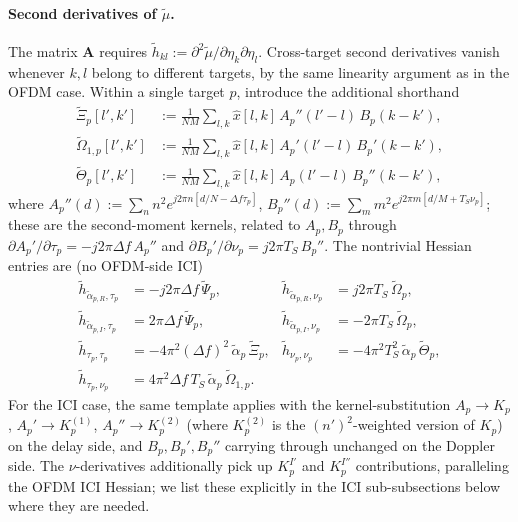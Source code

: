 \documentclass[11pt]{article}
\begin{document}
\paragraph{Second derivatives of \(\tilde{\mu}\).} The matrix \(\bm{A}\) requires \(\tilde{h}_{kl} := \partial^2 \tilde{\mu}/\partial \eta_k \partial \eta_l\). Cross-target second derivatives vanish whenever \(k,l\) belong to different targets, by the same linearity argument as in the OFDM case. Within a single target \(p\), introduce the additional shorthand
\begin{align}
    \tilde{\Xi}_p[l',k']      &:= \tfrac{1}{NM}\sum_{l,k} \hat{x}[l,k]\, A_p''(l'-l)\, B_p(k-k'), \\
    \tilde{\Omega}_{1,p}[l',k'] &:= \tfrac{1}{NM}\sum_{l,k} \hat{x}[l,k]\, A_p'(l'-l)\, B_p'(k-k'), \\
    \tilde{\Theta}_p[l',k']   &:= \tfrac{1}{NM}\sum_{l,k} \hat{x}[l,k]\, A_p(l'-l)\, B_p''(k-k'),
\end{align}
where \(A_p''(d) := \sum_n n^2 e^{j2\pi n[d/N - \Delta f \tau_p]}\), \(B_p''(d) := \sum_m m^2 e^{j2\pi m[d/M + T_S \nu_p]}\); these are the second-moment kernels, related to \(A_p, B_p\) through \(\partial A_p'/\partial \tau_p = -j2\pi\Delta f\, A_p''\) and \(\partial B_p'/\partial \nu_p = j2\pi T_S\, B_p''\). The nontrivial Hessian entries are (no OFDM-side ICI)
\begin{align}
    \tilde{h}_{\tilde{\alpha}_{p,R}, \tau_p} &= -j2\pi\Delta f\, \tilde{\Psi}_p, &
    \tilde{h}_{\tilde{\alpha}_{p,R}, \nu_p} &= j2\pi T_S\, \tilde{\Omega}_p, \\
    \tilde{h}_{\tilde{\alpha}_{p,I}, \tau_p} &= 2\pi\Delta f\, \tilde{\Psi}_p, &
    \tilde{h}_{\tilde{\alpha}_{p,I}, \nu_p} &= -2\pi T_S\, \tilde{\Omega}_p, \\
    \tilde{h}_{\tau_p, \tau_p} &= -4\pi^2 (\Delta f)^2\, \tilde{\alpha}_p\, \tilde{\Xi}_p, &
    \tilde{h}_{\nu_p, \nu_p} &= -4\pi^2 T_S^2\, \tilde{\alpha}_p\, \tilde{\Theta}_p, \\
    \tilde{h}_{\tau_p, \nu_p} &= 4\pi^2 \Delta f\, T_S\, \tilde{\alpha}_p\, \tilde{\Omega}_{1,p}. & &
\end{align}
For the ICI case, the same template applies with the kernel-substitution \(A_p \to K_p\), \(A_p' \to K_p^{(1)}\), \(A_p'' \to K_p^{(2)}\) (where \(K_p^{(2)}\) is the \((n')^2\)-weighted version of \(K_p\)) on the delay side, and \(B_p, B_p', B_p''\) carrying through unchanged on the Doppler side. The \(\nu\)-derivatives additionally pick up \(K_p^{I'}\) and \(K_p^{I''}\) contributions, paralleling the OFDM ICI Hessian; we list these explicitly in the ICI sub-subsections below where they are needed.
\end{document}
